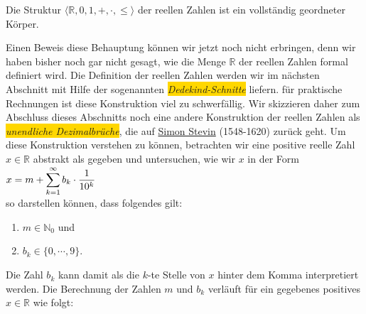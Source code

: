 \begin{Theorem}
  Die Struktur $\langle \mathbb{R}, 0, 1, +, \cdot, \leq \rangle$ der reellen Zahlen ist ein  vollst\"andig geordneter K\"orper.   \edx
\end{Theorem}

Einen Beweis diese Behauptung k\"onnen wir jetzt noch nicht erbringen, denn wir haben bisher noch gar nicht
gesagt, wie die Menge $\mathbb{R}$ der reellen Zahlen formal definiert wird.
Die Definition der reellen Zahlen werden wir im n\"achsten Abschnitt mit Hilfe der sogenannten
\colorbox{gold}{\emph{Dedekind-Schnitte}} liefern.  f\"ur praktische Rechnungen ist diese 
Konstruktion viel zu schwerf\"allig.  Wir skizzieren  daher zum Abschluss dieses
Abschnitts noch eine andere Konstruktion der reellen Zahlen als 
\colorbox{gold}{\emph{unendliche Dezimalbr\"uche}}, die
auf \href{http://en.wikipedia.org/wiki/Simon_Stevin}{Simon Stevin} (1548-1620) zur\"uck geht.  Um
diese Konstruktion verstehen zu k\"onnen,
betrachten wir eine positive reelle Zahl $x \in \mathbb{R}$ abstrakt als gegeben und untersuchen, wie wir $x$
in der Form
\\[0.2cm]
\hspace*{1.3cm}
$\displaystyle x = m + \sum\limits_{k=1}^\infty b_k \cdot \frac{1}{10^k}$
\\[0.2cm]
so darstellen k\"onnen, dass folgendes gilt:
\begin{enumerate}
\item $m \in \mathbb{N}_0$ \quad und
\item $b_k \in \{0,\cdots,9\}$.
\end{enumerate}
Die Zahl $b_k$ kann damit als die $k$-te Stelle von $x$ hinter dem Komma interpretiert werden.
Die Berechnung der Zahlen $m$ und $b_k$ verl\"auft f\"ur ein gegebenes positives $x \in \mathbb{R}$ wie folgt:
